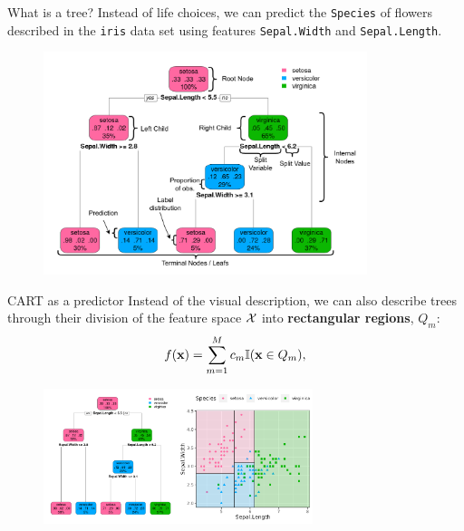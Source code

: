 \documentclass[11pt,compress,t,notes=noshow, xcolor=table]{beamer}
\begin{document}
\begin{vbframe}{What is a tree?}
Instead of life choices, we can predict the \texttt{Species} of flowers described in the \texttt{iris} data set using features \texttt{Sepal.Width} and \texttt{Sepal.Length}.
  
     \begin{figure}
    \centering
      \includegraphics[height = 6.5cm, keepaspectratio]{figure/cart_intro_annotated-tree.pdf}
    \end{figure}
\end{vbframe}

\begin{vbframe}{CART as a predictor}
Instead of the visual description, we can also describe trees through their division of the feature space $\mathcal{X}$ into \textbf{rectangular regions}, $Q_m$: 
  \begin{align*}
    f(\mathbf{x}) = \sum_{m=1}^M c_m \mathbb{I}(\mathbf{x} \in Q_m),
  \end{align*}
  \begin{figure}
    \centering
\includegraphics[width=0.7\textwidth, keepaspectratio]{figure/tree-classif-depth-3-blacklines.pdf}
    \end{figure}
\end{vbframe}
\end{document}
